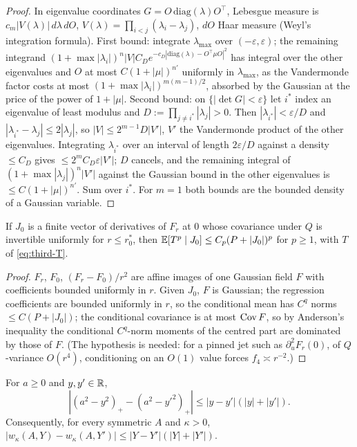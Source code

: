 \begin{proof}
In eigenvalue coordinates $G=O\,\mathrm{diag}(\lambda)O^\top$, Lebesgue measure is $c_m|V(\lambda)|\,d\lambda\,dO$, $V(\lambda)=\prod_{i<j}(\lambda_i-\lambda_j)$, $dO$ Haar measure (Weyl's integration formula). First bound: integrate $\lambda_{\max}$ over $(-\varepsilon,\varepsilon)$; the remaining integrand $(1+\max|\lambda_i|)^n|V|C_De^{-c_D|\mathrm{diag}(\lambda)-O^\top\mu O|^2}$ has integral over the other eigenvalues and $O$ at most $C(1+|\mu|)^{n'}$ uniformly in $\lambda_{\max}$, as the Vandermonde factor costs at most $(1+\max|\lambda_i|)^{m(m-1)/2}$, absorbed by the Gaussian at the price of the power of $1+|\mu|$. Second bound: on $\{|\det G|<\varepsilon\}$ let $i^*$ index an eigenvalue of least modulus and $D:=\prod_{j\ne i^*}|\lambda_j|>0$. Then $|\lambda_{i^*}|<\varepsilon/D$ and $|\lambda_{i^*}-\lambda_j|\le2|\lambda_j|$, so $|V|\le2^{m-1}D|V'|$, $V'$ the Vandermonde product of the other eigenvalues. Integrating $\lambda_{i^*}$ over an interval of length $2\varepsilon/D$ against a density $\le C_D$ gives $\le2^mC_D\varepsilon|V'|$; $D$ cancels, and the remaining integral of $(1+\max|\lambda_j|)^n|V'|$ against the Gaussian bound in the other eigenvalues is $\le C(1+|\mu|)^{n'}$. Sum over $i^*$. For $m=1$ both bounds are the bounded density of a Gaussian variable.
\end{proof}

\begin{lemma}\label{lem:third-condmom}
If $J_0$ is a finite vector of derivatives of $F_r$ at $0$ whose covariance under $Q$ is invertible uniformly for $r\le r_0^*$, then $\mathbb E[T^p\mid J_0]\le C_p(P+|J_0|)^p$ for $p\ge1$, with $T$ of \eqref{eq:third-T}.
\end{lemma}

\begin{proof}
$F_r$, $F_0$, $(F_r-F_0)/r^2$ are affine images of one Gaussian field $F$ with coefficients bounded uniformly in $r$. Given $J_0$, $F$ is Gaussian; the regression coefficients are bounded uniformly in $r$, so the conditional mean has $C^q$ norms $\le C(P+|J_0|)$; the conditional covariance is at most $\operatorname{Cov} F$, so by Anderson's inequality the conditional $C^q$-norm moments of the centred part are dominated by those of $F$. (The hypothesis is needed: for a pinned jet such as $\partial_u^2F_r(0)$, of $Q$-variance $O(r^4)$, conditioning on an $O(1)$ value forces $f_4\asymp r^{-2}$.)
\end{proof}

\begin{lemma}\label{lem:third-L}
For $a\ge0$ and $y,y'\in\mathbb R$,
\begin{equation}\label{eq:third-L1}
|(a^2-y^2)_+-(a^2-y'^2)_+|\le|y-y'|(|y|+|y'|).
\end{equation}
Consequently, for every symmetric $A$ and $\kappa>0$, $|w_\kappa(A,Y)-w_\kappa(A,Y')|\le|Y-Y'|(|Y|+|Y'|)$.
\end{lemma}


